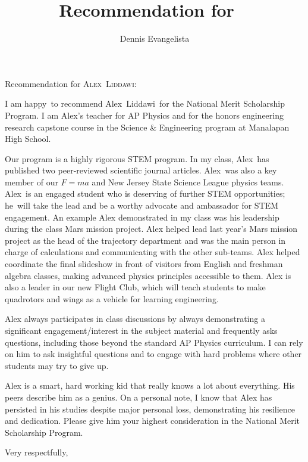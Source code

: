 \documentclass[10pt]{letter}
\title{Recommendation for \firstname\ \lastname}
\author{Dennis Evangelista}
\date{}
\newcommand\firstname{Alex}
\newcommand\lastname{Liddawi}
\newcommand\subject{he}
\newcommand\adjective{happy}
\begin{document}
\begin{letter}{%
}

\opening{Recommendation for {\scshape\firstname\ \lastname}:}

I am \adjective\ to recommend \firstname\ \lastname\ for the National Merit Scholarship Program.  I am \firstname's teacher for AP Physics and for the honors engineering research capstone course in the Science \& Engineering program at Manalapan High School. 

Our program is a highly rigorous STEM program. In my class, \firstname\ has published two peer-reviewed scientific journal articles.  \firstname\ was also a key member of our $F=ma$ and New Jersey State Science League physics teams. \firstname\ is an engaged student who is deserving of further STEM opportunities; \subject\ will take the lead and be a worthy advocate and ambassador for STEM engagement.  An example Alex demonstrated in my class was his leadership during the class Mars mission project. Alex helped lead last year’s Mars mission project as the head of the trajectory department and was the main person in charge of calculations and communicating with the other sub-teams. Alex helped coordinate the final slideshow in front of visitors from English and freshman algebra classes, making advanced physics principles accessible to them.  Alex is also a leader in our new Flight Club, which will teach students to make quadrotors and wings as a vehicle for learning engineering. 

Alex always participates in class discussions by always demonstrating a significant engagement/interest in the subject material and frequently asks questions, including those beyond the standard AP Physics curriculum. I can rely on him to ask insightful questions and to engage with hard problems where other students may try to give up. 

Alex is a smart, hard working kid that really knows a lot about everything. His peers describe him as a genius. On a personal note, I know that Alex has persisted in his studies despite major personal loss, demonstrating his resilience and dedication. Please give him your highest consideration in the National Merit Scholarship Program. 


\closing{Very respectfully,}

\end{letter}
\end{document}
